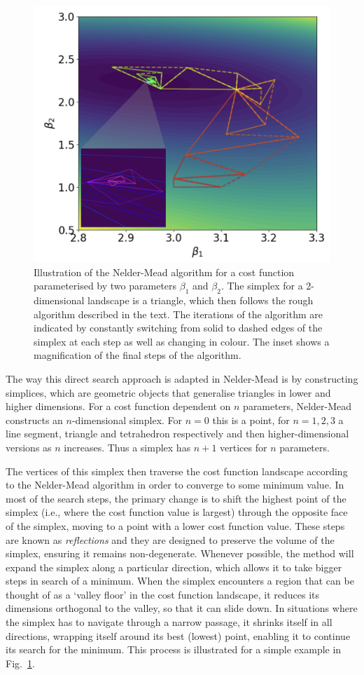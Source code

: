 \begin{figure}[t]
\centering
\includegraphics[width=0.6\linewidth]{images/nelder_mead_illustration.png} \caption[Visualising the Nelder-Mead optimisation algorithm.]{Illustration of the Nelder-Mead algorithm for a cost function parameterised by two parameters $\beta_1$ and $\beta_2$. The simplex for a 2-dimensional landscape is a triangle, which then follows the rough algorithm described in the text. The iterations of the algorithm are indicated by constantly switching from solid to dashed edges of the simplex at each step as well as changing in colour. The inset shows a magnification of the final steps of the algorithm.}\label{fig:nelder_mead}
\end{figure}

The way this direct search approach is adapted in Nelder-Mead is by constructing simplices, which are geometric objects that generalise triangles in lower and higher dimensions. For a cost function dependent on $n$ parameters, Nelder-Mead constructs an $n$-dimensional simplex. For $n=0$ this is a point, for $n=1,2,3$ a line segment, triangle and tetrahedron respectively and then higher-dimensional versions as $n$ increases. Thus a simplex has $n+1$ vertices for $n$ parameters. 

The vertices of this simplex then traverse the cost function landscape according to the Nelder-Mead algorithm in order to converge to some minimum value.  In most of the search steps, the primary change is to shift the highest point of the simplex (i.e., where the cost function value is largest) through the opposite face of the simplex, moving to a point with a lower cost function value. These steps are known as \emph{reflections} and they are designed to preserve the volume of the simplex, ensuring it remains non-degenerate. Whenever possible, the method will expand the simplex along a particular direction, which allows it to take bigger steps in search of a minimum. When the simplex encounters a region that can be thought of as a `valley floor' in the cost function landscape, it reduces its dimensions orthogonal to the valley, so that it can slide down. In situations where the simplex has to navigate through a narrow passage, it shrinks itself in all directions, wrapping itself around its best (lowest) point, enabling it to continue its search for the minimum. This process is illustrated for a simple example in Fig.~\ref{fig:nelder_mead}.

